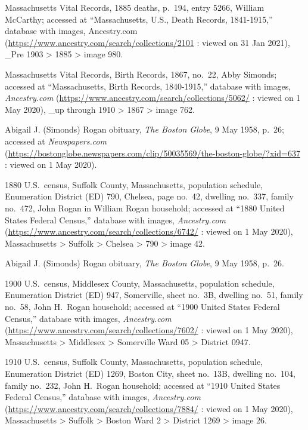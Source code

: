 \begin{thebibliography}{999}
Massachusetts Vital Records, 1885 deaths, p.\ 194, entry 5266, William McCarthy; accessed at ``Massachusetts, U.S., Death Records, 1841-1915,'' database with images, Ancestry.com (\url{https://www.ancestry.com/search/collections/2101} : viewed on 31 Jan 2021), \_Pre 1903 > 1885 > image 980.


Massachusetts Vital Records, Birth Records, 1867, no.\ 22, Abby Simonds; accessed at ``Massachusetts, Birth Records, 1840-1915,'' database with images, \textit{Ancestry.com} (\url{https://www.ancestry.com/search/collections/5062/} : viewed on 1 May 2020), \_up through 1910 > 1867 > image 762.

Abigail J. (Simonds) Rogan obituary, \textit{The Boston Globe}, 9 May 1958, p.\ 26; accessed at \textit{Newspapers.com} (\url{https://bostonglobe.newspapers.com/clip/50035569/the-boston-globe/?xid=637} : viewed on 1 May 2020).

1880 U.S.\ census, Suffolk County, Massachusetts, population schedule, Enumeration District (ED) 790, Chelsea, page no.\ 42, dwelling no.\ 337, family no.\ 472, John Rogan in William Rogan household; accessed at ``1880 United States Federal Census,'' database with images, \textit{Ancestry.com} (\url{https://www.ancestry.com/search/collections/6742/} : viewed on 1 May 2020), Massachusetts > Suffolk > Chelsea > 790 > image 42.

Abigail J. (Simonds) Rogan obituary, \textit{The Boston Globe}, 9 May 1958, p.\ 26.

1900 U.S.\ census, Middlesex County, Massachusetts, population schedule, Enumeration District (ED) 947, Somerville, sheet no.\ 3B, dwelling no.\ 51, family no.\ 58, John H.\ Rogan household; accessed at ``1900 United States Federal Census,'' database with images, \textit{Ancestry.com} (\url{https://www.ancestry.com/search/collections/7602/} : viewed on 1 May 2020), Massachusetts > Middlesex > Somerville Ward 05 > District 0947.

1910 U.S.\ census, Suffolk County, Massachusetts, population schedule, Enumeration District (ED) 1269, Boston City, sheet no.\ 13B, dwelling no.\ 104, family no.\ 232, John H.\ Rogan household; accessed at ``1910 United States Federal Census,'' database with images, \textit{Ancestry.com} (\url{https://www.ancestry.com/search/collections/7884/} : viewed on 1 May 2020), Massachusetts > Suffolk > Boston Ward 2 > District 1269 > image 26.


\end{thebibliography}
